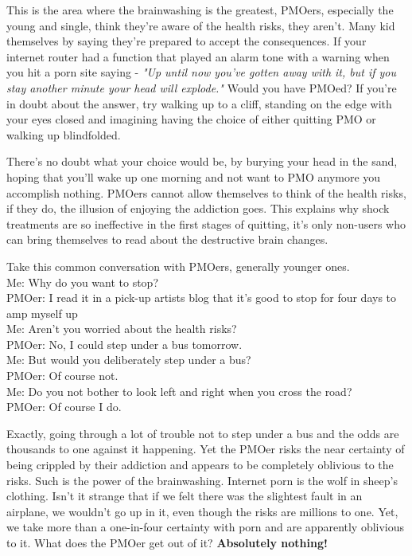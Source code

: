 \documentclass[easypeasy.tex]{subfiles}
\begin{document}
This is the area where the brainwashing is the greatest, PMOers, especially the young and single, think they're aware of the health risks, they aren't. Many kid themselves by saying they're prepared to accept the consequences. If your internet router had a function that played an alarm tone with a warning when you hit a porn site saying - \textit{"Up until now you've gotten away with it, but if you stay another minute your head will explode."} Would you have PMOed? If you're in doubt about the answer, try walking up to a cliff, standing on the edge with your eyes closed and imagining having the choice of either quitting PMO or walking up blindfolded.

There's no doubt what your choice would be, by burying your head in the sand, hoping that you'll wake up one morning and not want to PMO anymore you accomplish nothing. PMOers cannot allow themselves to think of the health risks, if they do, the illusion of enjoying the addiction goes. This explains why shock treatments are so ineffective in the first stages of quitting, it's only non-users who can bring themselves to read about the destructive brain changes.

Take this common conversation with PMOers, generally younger ones.\\
  Me: Why do you want to stop?\\
  PMOer: I read it in a pick-up artists blog that it's good to stop for four days to amp myself up\\
  Me: Aren't you worried about the health risks?\\
  PMOer: No, I could step under a bus tomorrow.\\
  Me: But would you deliberately step under a bus?\\
  PMOer: Of course not.\\
  Me: Do you not bother to look left and right when you cross the road?\\
  PMOer: Of course I do.

Exactly, going through a lot of trouble not to step under a bus and the odds are thousands to one against it happening. Yet the PMOer risks the near certainty of being crippled by their addiction and appears to be completely oblivious to the risks. Such is the power of the brainwashing. Internet porn is the wolf in sheep's clothing. Isn't it strange that if we felt there was the slightest fault in an airplane, we wouldn't go up in it, even though the risks are millions to one. Yet, we take more than a one-in-four certainty with porn and are apparently oblivious to it. What does the PMOer get out of it? \textbf{Absolutely nothing!}
\end{document}

